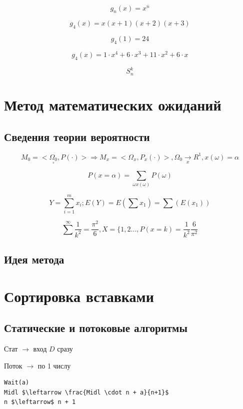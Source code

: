 \documentclass[a4paper, 14pt]{report}
\begin{document}
$$
g_n(x) = x^{\overline{n}}
$$

$$
g_4(x) = x(x+1)(x+2)(x+3)
$$

$$
g_4(1) = 24
$$

$$
g_4(x) = 1 \cdot x^4 + 6 \cdot x^3 + 11 \cdot x^2 + 6 \cdot x
$$

$$
S_n^k
$$

\chapter{Метод математических ожиданий}

\section{Сведения теории вероятности}

$$
M_0 = < \underset{\square}{\Omega_0}, P( \cdot ) > \Rightarrow M_x = < \Omega_x, P_x( \cdot ) >, \Omega_0 \underset{x}{\to} R^1, x(\omega) = \alpha
$$

$$
P(x = \alpha) = \sum_{\omega x (\omega)} P(\omega)
$$

$$
Y = \sum_{i=1}^m x_i; E(Y) = E(\sum x_1) = \sum(E(x_1))
$$

$$
\sum^\infty \frac{1}{k^2} = \frac{\pi^2}{6}, X = \{1,2..., P(x=k) = \frac{1}{k^2} \frac{6}{\pi^2}
$$

\section{Идея метода}

\chapter{Сортировка вставками}

\section{Статические и потоковые алгоритмы}

Стат $\to$ вход $D$ сразу

Поток $\to$ по 1 числу

\begin{lstlisting}
Wait(a)
Midl $\leftarrow \frac{Midl \cdot n + a}{n+1}$
n $\leftarrow$ n + 1
\end{lstlisting}
\end{document}
